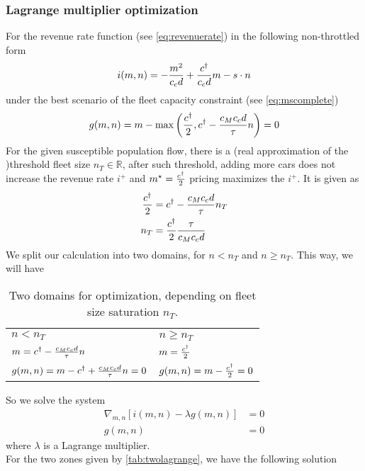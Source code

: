 \documentclass[a4paper]{report}
\begin{document}
\subsubsection{Lagrange multiplier optimization}
For the revenue rate function (see \autoref{eq:revenuerate}) in the following non-throttled form
\begin{equation}
	i(m,n)=-\frac{m^2}{c_cd}+\frac{c^{\dagger}}{c_cd}m-s\cdot n \label{eq:revenueratefree}
\end{equation}
under the best scenario of the fleet capacity constraint (see \autoref{eq:mscomplete})
\begin{equation}
	g(m,n)=m - \max\left(\frac{c^{\dagger}}{2},c^{\dagger}-\frac{c_Mc_cd}{\tau}n\right)=0 \label{eq:lagrangeconst}
\end{equation}
For the given susceptible population flow, there is a (real approximation of the )threshold fleet size $n_T\in \mathbb{R}$, after such threshold, adding more cars does not increase the revenue rate $i^{+}$ and $m^{\star}=\frac{c^{\dagger}}{2}$ pricing maximizes the $i^{+}$. It is given as
\begin{align}
	\frac{c^{\dagger}}{2}&=c^{\dagger}-\frac{c_Mc_cd}{\tau} n_T \nonumber\\
	n_T&=\frac{c^{\dagger}}{2}\frac{\tau}{c_Mc_cd} \label{eq:threshn}
\end{align}
We split our calculation into two domains, for $n<n_T$ and $n\geq n_T$. This way, we will have\\

\begin{table}[ht]
	\centering
	\begin{tabular}{p{}| p{}}
		$n < n_T$					& $n \geq n_T$ \\
		$m = c^{\dagger} - \frac{c_Mc_cd}{\tau} n$			& $m = \frac{c^{\dagger}}{2}$ \\
		$g(m,n)= m - c^{\dagger} + \frac{c_Mc_cd}{\tau} n = 0$	& $g(m,n) = m - \frac{c^{\dagger}}{2} = 0$\\ 
	\end{tabular}
	\caption{Two domains for optimization, depending on fleet size saturation $n_T$.}
	\label{tab:twolagrange}
\end{table}

So we solve the system
\begin{align*}
	\nabla_{m,n} \left[i(m,n)-\lambda g(m,n)\right]&=0\\
	g(m,n)&=0
\end{align*}
where $\lambda$ is a Lagrange multiplier.\\

For the two zones given by \autoref{tab:twolagrange}, we have the following solution
\end{document}
